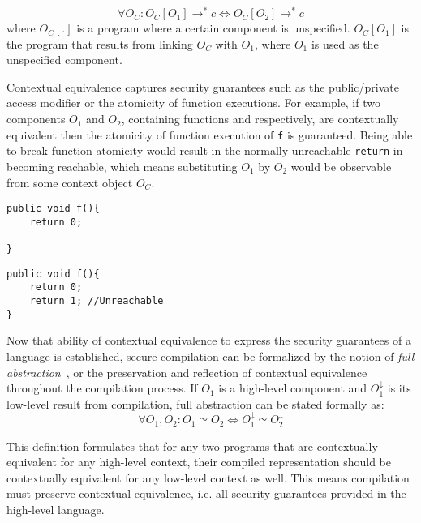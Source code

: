 \documentclass[11pt]{article}
\newcommand{\com}[1]{#1^\downarrow}
\begin{document}
\[
 \forall O_C : O_C[O_1] \rightarrow^* c \iff O_C[O_2] \rightarrow^* c
\]
where $O_{C}[.]$ is a program where a certain component is unspecified. 
$O_{C}[O_1]$ is the program that results from linking $O_C$ with $O_1$, where $O_1$ is used as the unspecified component.

Contextual equivalence captures security guarantees such as the public/private access modifier or the atomicity of function executions. For example, if two components $O_1$ and $O_2$, containing functions  and  respectively, are contextually equivalent then the atomicity of function execution of \lstinline{f} is guaranteed. Being able to break function atomicity would result in the normally unreachable \lstinline{return} in  becoming reachable, which means substituting $O_1$ by $O_2$ would be observable from some context object $O_C$.

\begin{minipage}{0.40\textwidth}
\begin{lstlisting}[label={lst:SimpleReturn}, caption={Simple return}]
public void f(){
    return 0;
    
}
\end{lstlisting}
\end{minipage}
\begin{minipage}{0.40\textwidth}
\begin{lstlisting}[label={lst:UnreachableCode}, caption={Unreachable code}]
public void f(){
    return 0; 
    return 1; //Unreachable
}
\end{lstlisting}
\end{minipage}

Now that ability of contextual equivalence to express the security guarantees of a language is established, secure compilation can be formalized by the notion of \emph{full abstraction}~\cite{Abadi}, or the preservation and reflection of contextual equivalence throughout the compilation process.
If $O_1$ is a high-level component and $\com{O_1}$ is its low-level result from compilation, full abstraction can be stated formally as:
\[
 \forall O_1, O_2 : O_1 \simeq O_2 \iff \com{O_1} \simeq \com{O_2}
\]

This definition formulates that for any two programs that are contextually equivalent for any high-level context, their compiled representation should be contextually equivalent for any low-level context as well. 
This means compilation must preserve contextual equivalence, i.e. all security guarantees provided in the high-level language.
\end{document}
